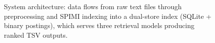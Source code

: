 \begin{figure}[t]
{\begin{tikzpicture}
\end{tikzpicture}%
}
\caption{System architecture: data flows from raw text files through preprocessing and SPIMI indexing into a dual-store index (SQLite + binary postings), which serves three retrieval models producing ranked TSV outputs.}
\label{fig:architecture}
\end{figure}
